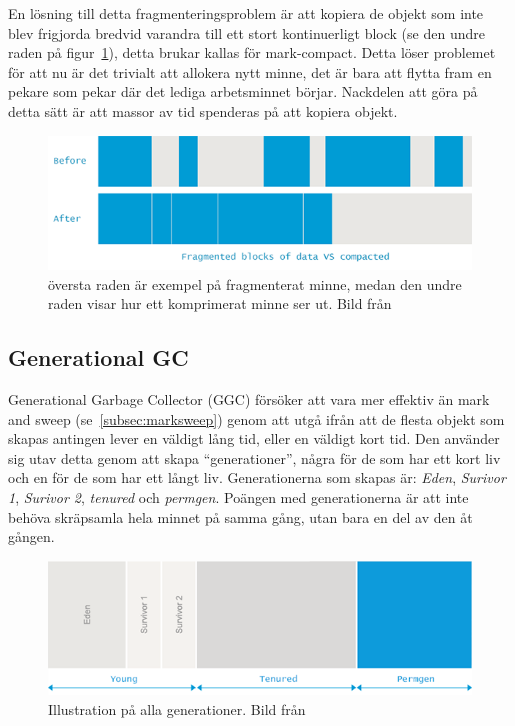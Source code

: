 \documentclass[12pt,a4paper]{article}
\begin{document}
En lösning till detta fragmenteringsproblem är att kopiera de objekt
som inte blev frigjorda bredvid varandra till ett stort kontinuerligt
block (se den undre raden på figur~\ref{fig:frag}), detta brukar
kallas för mark-compact. Detta löser problemet för att nu är det
trivialt att allokera nytt minne, det är bara att flytta fram en
pekare som pekar där det lediga arbetsminnet börjar. Nackdelen att
göra på detta sätt är att massor av tid spenderas på att kopiera
objekt.

\begin{figure}[H]
  \centering
  \includegraphics[width=1\textwidth]{frag_vs_comp_mem.png}
  \caption{översta raden är exempel på fragmenterat minne, medan den undre raden visar hur ett komprimerat minne ser ut. Bild från \cite{plumbr2}}
  \label{fig:frag}
\end{figure}

\subsection{Generational GC}
\label{subsec:generational}

Generational Garbage Collector (GGC) försöker att vara mer effektiv än
mark and sweep (se~\ref{subsec:marksweep}) genom att utgå ifrån
att de flesta objekt som skapas antingen lever en väldigt lång tid,
eller en väldigt kort tid. Den använder sig utav detta genom att skapa
``generationer'', några för de som har ett kort liv och en för de som
har ett långt liv. Generationerna som skapas är: \textit{Eden},
\textit{Surivor 1}, \textit{Surivor 2}, \textit{tenured} och
\textit{permgen}. Poängen med generationerna är att inte behöva
skräpsamla hela minnet på samma gång, utan bara en del av den åt gången.

\begin{figure}[H]
  \centering
  \includegraphics[width=\textwidth]{ggc_generations.png}
  \caption{\label{fig:generations} Illustration på alla generationer. Bild från \cite{plumbr2}}
\end{figure}
\end{document}
